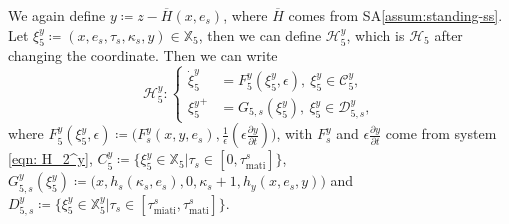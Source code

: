 
We again define $y \coloneqq z - \overline{H}(x,e_s)$, where $\overline{H}$ comes from SA\ref{assum:standing-ss}. Let $\xi_5^y \coloneqq (x,e_s,\tau_s, \kappa_s,y) \in \mathbb{X}_5$,
then we can define $\mathcal{H}_5^y$, which is $\mathcal{H}_5$ after changing the coordinate.  Then we can write
\begin{equation*}
    \mathcal{H}_5^y:\left\{
\begin{aligned}
    \dot{\xi}_5^y &= F_5^y(\xi_5^y, \epsilon),\ \xi_5^y \in \mathcal{C}_5^y, \\
    {\xi_5^y}^+ &= G_{5,s}(\xi_5^y), \ \xi_5^y \in \mathcal{D}_{5,s}^y,
\end{aligned}
    \right.
\end{equation*}
where $F_5^y(\xi_5^y, \epsilon) \coloneqq \big(F_s^y(x,y,e_s), \tfrac{1}{\epsilon} (\epsilon \tfrac{\partial y}{\partial t})  \big)$, with $F_s^y$ and $\epsilon \tfrac{\partial y}{\partial t}$ come from system \eqref{eqn: H_2^y}, $C_5^y \coloneqq \{ \xi_5^y \in \mathbb{X}_5 | \tau_s \in [0, \tau_{\text{mati}}^s]\}$, $G_{5,s}^y(\xi_5^y) \coloneqq \big(x, h_s(\kappa_s, e_s), 0, \kappa_s + 1, h_y(x,e_s,y)\big)$ and $D_{5,s}^y \coloneqq \{ \xi_5^y \in \mathbb{X}_5^y | \tau_s \in [\tau_{\text{miati}}^s, \tau_{\text{mati}}^s]\}$.







